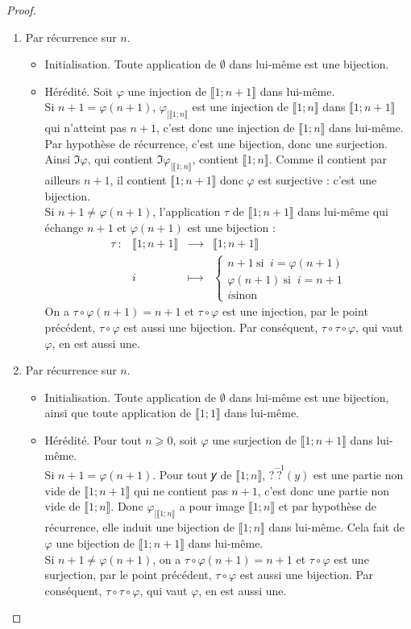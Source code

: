 \begin{proof}
\par\noindent
\begin{enumerate}
\item Par récurrence sur \(𝑛\).
\begin{itemize}
\item
Initialisation. Toute application de \( ∅\) dans lui-même est une bijection.
\item
Hérédité. Soit \(𝜑\) une injection de \(⟦1;𝑛+1⟧\) dans lui-même.
\\
Si \(𝑛+1=𝜑(𝑛+1)\), \(𝜑_{\left|⟦1;𝑛⟧\right.}\) est une injection de \(⟦1;𝑛⟧\) dans \(⟦1;𝑛+1⟧\) qui
n'atteint pas \(𝑛+1\), c'est donc une injection de \(⟦1;𝑛⟧\) dans lui-même. Par hypothèse de récurrence, c'est une
bijection, donc une surjection. Ainsi \(\Im 𝜑\), qui contient \(\Im 𝜑_{\left|⟦1;𝑛⟧\right.}\), contient \(⟦1;𝑛⟧\).
Comme il contient par ailleurs \(𝑛+1\), il contient \(⟦1;𝑛+1⟧\) donc \(𝜑\) est surjective : c'est une bijection.
\\
Si \(𝑛+1≠𝜑(𝑛+1)\), l'application \(𝜏\) de \(⟦1;𝑛+1⟧\) dans lui-même qui échange \(𝑛+1\) et \(𝜑(𝑛+1)\) est
une bijection :
\begin{equation*}
\begin{matrix}
𝜏~:&⟦1;𝑛+1⟧&⟶&⟦1;𝑛+1⟧
\\
&𝑖&⟼&\begin{cases}
𝑛+1~\text{si }~𝑖=𝜑(𝑛+1)
\\
𝜑(𝑛+1)~\text{si }~𝑖=𝑛+1
\\
𝑖\text{sinon}
\end{cases}
\end{matrix}
\end{equation*}
On a \(𝜏∘𝜑(𝑛+1)=𝑛+1\) et \(𝜏∘𝜑\) est une injection, par le point précédent, \(𝜏∘𝜑\) est aussi une bijection. Par
conséquent, \(𝜏∘𝜏∘𝜑\), qui vaut \(𝜑\), en est aussi une.
\end{itemize}%
\item Par récurrence sur \(𝑛\).
\begin{itemize}
\item
Initialisation.
Toute application de \( ∅\) dans lui-même est une bijection, ainsi que toute application de
\(⟦1;1⟧\) dans lui-même.
\item
Hérédité.
Pour tout \(𝑛⩾0\), soit \(𝜑\) une surjection de \(⟦1;𝑛+1⟧\) dans lui-même.
\\
Si \(𝑛+1=𝜑(𝑛+1)\). Pour tout 𝑦 de \(⟦1;𝑛⟧\), \(?\overset{-1}{?}(𝑦)\) est une partie non vide de \(⟦1;𝑛+1⟧\)
 qui ne contient pas \(𝑛+1\), c'est donc une partie non vide de \(⟦1;𝑛⟧\). Donc \(𝜑_{\left|⟦1;𝑛⟧\right.}\) a pour
image \(⟦1;𝑛⟧\) et par hypothèse de récurrence, elle induit une bijection de \(⟦1;𝑛⟧\) dans lui-même. Cela fait de
\(𝜑\) une bijection de \(⟦1;𝑛+1⟧\) dans lui-même.
\\
Si \(𝑛+1≠𝜑(𝑛+1)\), on a \(𝜏∘𝜑(𝑛+1)=𝑛+1\) et \(𝜏∘𝜑\) est une surjection, par le point précédent, \(𝜏∘𝜑\)
est aussi une bijection. Par conséquent, \(𝜏∘𝜏∘𝜑\), qui vaut \(𝜑\), en est aussi une.\qedhere
\end{itemize}
\end{enumerate}
\end{proof}
